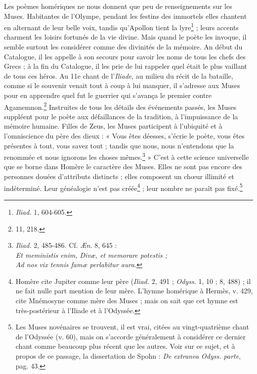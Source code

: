 \documentclass[landscape, a4paper, 11pt, oneside, polutonikogreek, french]{article}
\begin{document}
Les poèmes homériques ne nous donnent que peu de renseignements sur les Muses. Habitantes de l'Olympe, pendant les festins des immortels elles chantent en alternant de leur belle voix, tandis qu'Apollon tient la lyre\footnote{\emph{Iliad.} 1, 604-605.} ; leurs accents charment les loisirs fortunés de la vie divine. Mais quand le poète les invoque, il semble surtout les considérer comme des divinités de la mémoire. An début du Catalogue, il les appelle à son secours pour savoir les noms de tous les chefs des Grecs ; à la fin du Catalogue, il les prie de lui rappeler quel était le plus vaillant de tous ces héros. Au 11e chant de l'\emph{Iliade}, au milieu du récit de la bataille, comme si le souvenir venait tout à coup à lui manquer, il s'adresse aux Muses pour en apprendre quel fut le guerrier qui s'avança le premier contre Agamemnon.\footnote{11, 218.} Instruites de tous les détails des événements passés, les Muses suppléent pour le poète aux défaillances de la tradition, à l'impuissance de la mémoire humaine. Filles de Zeus, les Muses participent à l'ubiquité et à l'omniscience du père des dieux : « Vous êtes déesses, s'écrie le poète, vous êtes présentes à tout, vous savez tout ; tandis que nous, nous n'entendons que la renommée et nous ignorons les choses mêmes.\footnote{\emph{Iliad.} 2, 485-486. Cf. \emph{Æn.} 8, 645 :\\\hspace*{5mm}\emph{Et meministis enim, Divæ, et memorare potestis ;}\\\hspace*{5mm}\emph{Ad nos vix tennis famæ perlabitur aura.}} » C'est à cette science universelle que se borne dans Homère le caractère des Muses. Elles ne sont pas encore des personnes douées d'attributs distincts ; elles composent un chœur illimité et indéterminé. Leur généalogie n'est pas créée\footnote{Homère cite Jupiter comme leur père (\emph{Iliad.} 2, 491 ; \emph{Odyss.} 1, 10 ; 8, 488) ; il ne fait nulle part mention de leur mère. L'hymne homérique à Hermès, v. 429, cite Mnémosyne comme mère des Muses ; mais on sait que cet hymne est très-postérieur à l'Iliade et à l'Odyssée.} ; leur nombre ne paraît pas fixé.\footnote{Les Muses novénaires se trouvent, il est vrai, citées au vingt-quatrième chant de l'Odyssée (v. 60), mais on s'accorde généralement à considérer ce dernier chant comme beaucoup plus récent que les autres. Voir sur ce sujet, et à propos de ce passage, la dissertation de Spohn : \emph{De extranea Odyss. parte}, pag. 43.}
\end{document}
